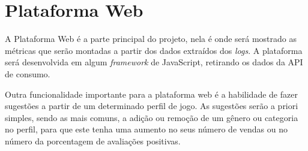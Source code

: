 \section{Plataforma Web}
A Plataforma Web é a parte principal do projeto, nela é onde será mostrado as métricas que serão montadas a partir dos dados extraídos dos \textit{logs}. A plataforma será desenvolvida em algum \textit{framework} de JavaScript, retirando os dados da API de consumo.

Outra funcionalidade importante para a plataforma web é a habilidade de fazer sugestões a partir de um determinado perfil de jogo. As sugestões serão a priori simples, sendo as mais comuns, a adição ou remoção de um gênero ou categoria no perfil, para que este tenha uma aumento no seus número de vendas ou no número da porcentagem de avaliações positivas.

